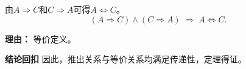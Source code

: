 \begin{proofbox}
\begin{description}[style=nextline, leftmargin=2.8em, labelsep=0.5em, itemsep=0.55em]
		\item[\textbf{步骤九（合并等价）：}] 由$A\Rightarrow C$和$C\Rightarrow A$可得$A\Leftrightarrow C$。
			\[
				(A\Rightarrow C)\land(C\Rightarrow A)\;\Longrightarrow\;A\Leftrightarrow C.
			\]
			\par\textbf{理由：} 等价定义。
	\end{description}

	\medskip
	\textbf{\textcolor{CProof}{结论回扣}}
	因此，推出关系与等价关系均满足传递性，定理得证。
\end{proofbox}
